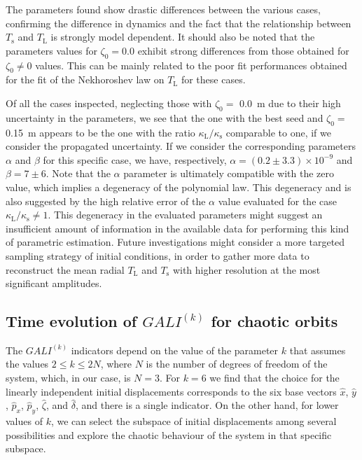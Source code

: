 The parameters found show drastic differences between the various cases, confirming the difference in dynamics and the fact that the relationship between $T_\mathrm{s}$ and $T_\mathrm{L}$ is strongly model dependent. It should also be noted that the parameters values for $\zeta_0=0.0$ exhibit strong differences from those obtained for $\zeta_0 \neq 0$ values. This can be mainly related to the poor fit performances obtained for the fit of the Nekhoroshev law on $T_\mathrm{L}$ for these cases.

Of all the cases inspected, neglecting those with $\zeta_0 =$ \SI{0.0}{\meter} due to their high uncertainty in the parameters, we see that the one with the best seed and $\zeta_0 =$ \SI{0.15}{\meter} appears to be the one with the ratio $\kappa_\mathrm{L}/\kappa_{\mathrm{s}}$ comparable to one, if we consider the propagated uncertainty. If we consider the corresponding parameters $\alpha$ and $\beta$ for this specific case, we have, respectively, $\alpha = (0.2\pm3.3)\times10^{-9}$ and $\beta = 7\pm6$. Note that the $\alpha$ parameter is ultimately compatible with the zero value, which implies a degeneracy of the polynomial law. This degeneracy and is also suggested by the high relative error of the $\alpha$ value evaluated for the case $\kappa_\mathrm{L}/\kappa_\mathrm{s}\neq 1$. This degeneracy in the evaluated parameters might suggest an insufficient amount of information in the available data for performing this kind of parametric estimation. Future investigations might consider a more targeted sampling strategy of initial conditions, in order to gather more data to reconstruct the mean radial $T_\mathrm{L}$ and $T_\mathrm{s}$ with higher resolution at the most significant amplitudes.

\subsection{Time evolution of $GALI^{(k)}$ for chaotic orbits}

The $GALI^{(k)}$ indicators depend on the value of the parameter $k$ that assumes the values $2 \leq k \leq 2N$, where $N$ is the number of degrees of freedom of the system, which, in our case, is $N=3$. For $k=6$ we find that the choice for the linearly independent initial displacements corresponds to the six base vectors $\hat{x}$, $\hat{y}$, $\hat{p}_x$, $\hat{p}_y$, $\hat{\zeta}$, and $\hat{\delta}$, and there is a single indicator. On the other hand, for lower values of $k$, we can select the subspace of initial displacements among several possibilities and explore the chaotic behaviour of the system in that specific subspace.

